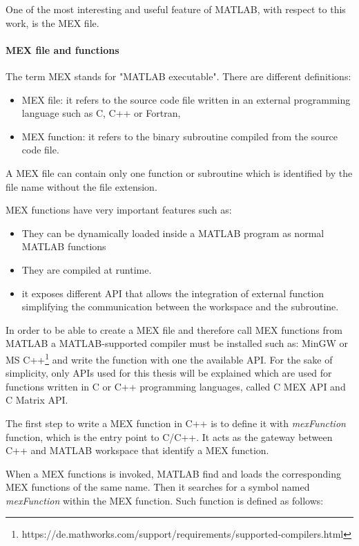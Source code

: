 \documentclass[12pt,a4paper]{extarticle}
\begin{document}
One of the most interesting and useful feature of MATLAB, with respect to this work, is the MEX file.
\paragraph{MEX file and functions} The term MEX stands for "MATLAB executable". %
There are different definitions:
\begin{itemize}
\item MEX file: it refers to the source code file written in an external programming language such as C, C++ or Fortran,
\item MEX function: it refers to the binary subroutine compiled from the source code file.
\end{itemize}

A MEX file can contain only one function or subroutine which is identified by the file name without the file extension.

MEX functions have very important features such as:
\begin{itemize}
\item They can be dynamically loaded inside a MATLAB program as normal MATLAB functions
\item They are compiled at runtime.
\item it exposes different API that allows the integration of external function simplifying the communication between the workspace and the subroutine.
\end{itemize}

In order to be able to create a MEX file and therefore call MEX functions from MATLAB a MATLAB-supported compiler must be installed such as: MinGW or MS C++\footnote{https://de.mathworks.com/support/requirements/supported-compilers.html} and write the function with one the available API. For the sake of simplicity, only APIs used for this thesis will be explained which are used for functions written in C or C++ programming languages, called C MEX API and C Matrix API.

The first step to write a MEX function in C++ is to define it with \textit{mexFunction} function, which is the entry point to C/C++. It acts as the gateway between C++ and MATLAB workspace that identify a MEX function.

When a MEX functions is invoked, MATLAB find and loads the corresponding MEX functions of the same name. Then it searches for a symbol named \textit{mexFunction} within the MEX function. Such function is defined as follows: %
\end{document}
